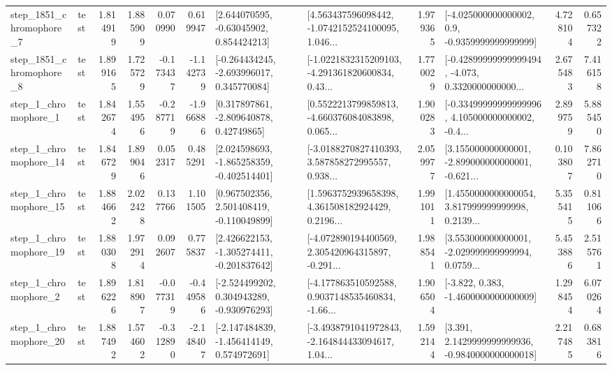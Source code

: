 \begin{tabular}{llrrrrllrlrr}
  step\_1851\_chromophore\_7 &      test &      1.814919 &    1.885909 &      0.070990 &  0.619947 &     [2.644070595, -0.63045902, 0.854424213] &  [4.563437596098442, -1.0742152524100095, 1.046... &       1.979365 &     [-4.025000000000002, 0.9, -0.9359999999999999] &            4.728104 &          0.657322 \\
  step\_1851\_chromophore\_8 &      test &      1.899165 &    1.725729 &     -0.173437 & -1.142739 &   [-0.264434245, -2.693996017, 0.345770084] &  [-1.0221832315209103, -4.291361820600834, 0.43... &       1.770029 &  [-0.42899999999999494, -4.073, 0.3320000000000... &            2.675483 &          7.416158 \\
     step\_1\_chromophore\_1 &      test &      1.842674 &    1.554956 &     -0.287719 & -1.966886 &     [0.317897861, -2.809640878, 0.42749865] &  [0.5522213799859813, -4.660376084083898, 0.065... &       1.900283 &  [-0.33499999999999996, 4.105000000000002, -0.4... &            2.899759 &          5.885450 \\
    step\_1\_chromophore\_14 &      test &      1.846729 &    1.899046 &      0.052317 &  0.485291 &   [2.024598693, -1.865258359, -0.402514401] &  [-3.0188270827410393, 3.587858272995557, 0.938... &       2.059977 &  [3.155000000000001, -2.899000000000001, -0.621... &            0.103807 &          7.862710 \\
    step\_1\_chromophore\_15 &      test &      1.884662 &    2.022428 &      0.137766 &  1.101505 &    [0.967502356, 2.501408419, -0.110049899] &  [1.5963752939658398, 4.361508182924429, 0.2196... &       1.991011 &  [1.4550000000000054, 3.817999999999998, 0.2139... &            5.355415 &          0.811066 \\
    step\_1\_chromophore\_19 &      test &      1.880308 &    1.972914 &      0.092607 &  0.775837 &   [2.426622153, -1.305274411, -0.201837642] &  [-4.072890194400569, 2.305420964315897, -0.291... &       1.988541 &  [3.553000000000001, -2.029999999999994, 0.0759... &            5.453886 &          2.515761 \\
     step\_1\_chromophore\_2 &      test &      1.896226 &    1.818907 &     -0.077319 & -0.449586 &   [-2.524499202, 0.304943289, -0.930976293] &  [-4.177863510592588, 0.9037148535460834, -1.66... &       1.906504 &               [-3.822, 0.383, -1.4600000000000009] &            1.298454 &          6.070264 \\
    step\_1\_chromophore\_20 &      test &      1.887492 &    1.574602 &     -0.312890 & -2.148407 &   [-2.147484839, -1.456414149, 0.574972691] &  [-3.4938791041972843, -2.164844433094617, 1.04... &       1.592144 &   [3.391, 2.1429999999999936, -0.9840000000000018] &            2.217485 &          0.683816 \\

\end{tabular}
